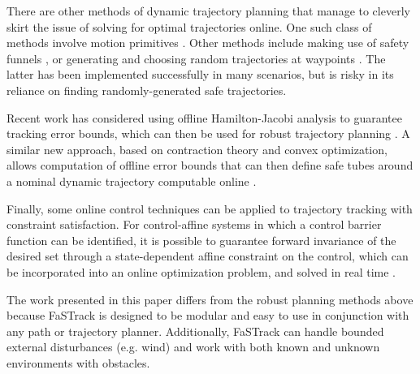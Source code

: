 There are other methods of dynamic trajectory planning that manage to cleverly skirt the issue of solving for optimal trajectories online.  One such class of methods involve motion primitives \cite{Gillula2010, Dey2016}. Other methods include making use of safety funnels \cite{Majumdar2016}, or generating and choosing random trajectories at waypoints \cite{Kalakrishnan2011, Schwesinger2013}. The latter has been implemented successfully in many scenarios, but is risky in its reliance on finding randomly-generated safe trajectories. 

Recent work has considered using offline Hamilton-Jacobi analysis to guarantee tracking error bounds, which can then be used for robust trajectory planning \cite{Bansal2017}. A similar new approach, based on contraction theory and convex optimization, allows computation of offline error bounds that can then define safe tubes around a nominal dynamic trajectory computable online \cite{Singh2017}.

Finally, some online control techniques can be applied to trajectory tracking with constraint satisfaction. For control-affine systems in which a control barrier function can be identified, it is possible to guarantee forward invariance of the desired set through a state-dependent affine constraint on the control, which can be incorporated into an online optimization problem, and solved in real time \cite{Ames2014}. %

The work presented in this paper differs from the robust planning methods above because FaSTrack is designed to be modular and easy to use in conjunction with any path or trajectory planner. Additionally, FaSTrack can handle bounded external disturbances (e.g. wind) and work with both known and unknown environments with obstacles.